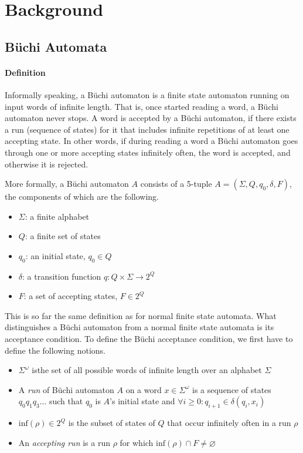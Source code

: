 \documentclass{scrreprt}
\begin{document}



\chapter{Background}
\section{Büchi Automata}
\subsubsection{Definition}
Informally speaking, a Büchi automaton is a finite state automaton running on input words of infinite length. That is, once started reading a word, a Büchi automaton never stops. A word is accepted by a Büchi automaton, if there exists a run (sequence of states) for it that includes infinite repetitions of at least one accepting state. In other words, if during reading a word a Büchi automaton goes through one or more accepting states infinitely often, the word is accepted, and otherwise it is rejected.

More formally, a Büchi automaton $A$ consists of a 5-tuple $A = (\Sigma, Q, q_0, \delta, F)$, the components of which are the following.
\begin{itemize}
\item $\Sigma$: a finite alphabet
\item $Q$: a finite set of states
\item $q_0$: an initial state, $q_0 \in Q$
\item $\delta$: a transition function $q: Q \times \Sigma \rightarrow 2^Q$ %
\item $F$: a set of accepting states, $F \in 2^Q$
\end{itemize}

This is so far the same definition as for normal finite state automata. What distinguishes a Büchi automaton from a normal finite state automata is its acceptance condition. To define the Büchi acceptance condition, we first have to define the following notions.

\begin{itemize}
\item $\Sigma^\omega$ isthe set of all possible words of infinite length over an alphabet $\Sigma$
\item A \emph{run} of Büchi automaton $A$ on a word $x \in \Sigma^\omega$ is a sequence of states $q_0q_1q_3\dots$ such that $q_0$ is $A$'s initial state and $\forall i \geq 0: q_{i+1} \in \delta(q_i, x_i)$
\item $\textrm{inf}(\rho) \in 2^Q$ is the subset of states of $Q$ that occur infinitely often in a run $\rho$
\item An \emph{accepting run} is a run $\rho$ for which $\textrm{inf}(\rho) \cap F \neq \varnothing$  
\end{itemize}
\end{document}
